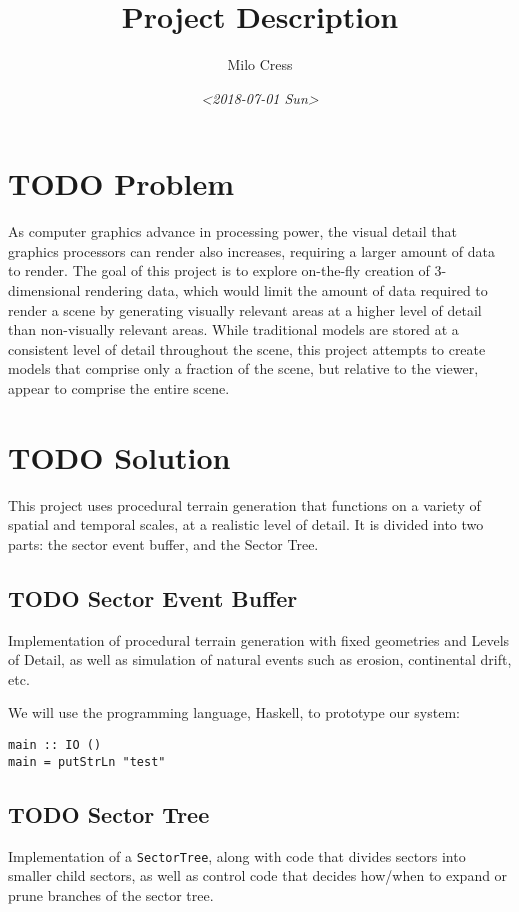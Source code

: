 \documentclass[11pt]{article}
\author{Milo Cress}
\date{\textit{<2018-07-01 Sun>}}
\title{Project Description}
\begin{document}
\maketitle
\tableofcontents


\section{{\bfseries\sffamily TODO} Problem}
\label{sec:org94bf369}
As computer graphics advance in processing power, the visual detail that graphics processors can render also increases, requiring a larger amount of data to render. The goal of this project is to explore on-the-fly creation of 3-dimensional rendering data, which would limit the amount of data required to render a scene by generating visually relevant areas at a higher level of detail than non-visually relevant areas. While traditional models are stored at a consistent level of detail throughout the scene, this project attempts to create models that comprise only a fraction of the scene, but relative to the viewer, appear to comprise the entire scene.
\section{{\bfseries\sffamily TODO} Solution}
\label{sec:orgcae93ad}
This project uses procedural terrain generation that functions on a variety of spatial and temporal scales, at a realistic level of detail. It is divided into two parts: the sector event buffer, and the Sector Tree.
\subsection{{\bfseries\sffamily TODO} Sector Event Buffer}
\label{sec:orgae3604d}
Implementation of procedural terrain generation with fixed geometries and Levels of Detail, as well as simulation of natural events such as erosion, continental drift, etc.

We will use the programming language, Haskell, to prototype our system:
\begin{verbatim}
main :: IO ()
main = putStrLn "test"
\end{verbatim}

\subsection{{\bfseries\sffamily TODO} Sector Tree}
\label{sec:org569f2ce}
Implementation of a \texttt{SectorTree}, along with code that divides sectors into smaller child sectors, as well as control code that decides how/when to expand or prune branches of the sector tree.
\end{document}
